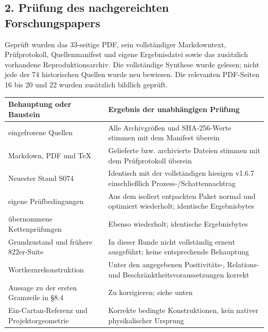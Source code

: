 \subsection{2. Prüfung des nachgereichten
Forschungspapers}\label{pruxfcfung-des-nachgereichten-forschungspapers}

Geprüft wurden das 33-seitige PDF, sein vollständiger Markdowntext,
Prüfprotokoll, Quellenmanifest und eigene Ergebnisdatei sowie das
zusätzlich vorhandene Reproduktionsarchiv. Die vollständige Synthese
wurde gelesen; nicht jede der 74 historischen Quellen wurde neu
bewiesen. Die relevanten PDF-Seiten 16 bis 20 und 22 wurden zusätzlich
bildlich geprüft.

{\def\LTcaptype{none} %
\begin{longtable}[]{@{}
  >{\raggedright\arraybackslash}p{}
  >{\raggedright\arraybackslash}p{}@{}}
\toprule\noalign{}
\begin{minipage}[b]{\linewidth}\raggedright
Behauptung oder Baustein
\end{minipage} & \begin{minipage}[b]{\linewidth}\raggedright
Ergebnis der unabhängigen Prüfung
\end{minipage} \\
\midrule\noalign{}
\endhead
\bottomrule\noalign{}
\endlastfoot
74 eingefrorene Quellen & Alle Archivgrößen und SHA-256-Werte stimmen
mit dem Manifest überein \\
Markdown, PDF und TeX & Gelieferte bzw. archivierte Dateien stimmen mit
dem Prüfprotokoll überein \\
Neuester Stand S074 & Identisch mit der vollständigen hiesigen v1.6.7
einschließlich Prozess-/Schattennachtrag \\
57 eigene Prüfbedingungen & Aus dem isoliert entpackten Paket normal und
optimiert wiederholt; identische Ergebnisbytes \\
20 übernommene Kettenprüfungen & Ebenso wiederholt; identische
Ergebnisbytes \\
Grundzustand und frühere 822er-Suite & In dieser Runde nicht vollständig
erneut ausgeführt; keine entsprechende Behauptung \\
Wortkernrekonstruktion & Unter den angegebenen Positivitäts-, Relations-
und Beschränktheitsvoraussetzungen korrekt \\
Aussage zu der ersten Gramzeile in §8.4 & Zu korrigieren; siehe unten \\
Ein-Cartan-Referenz und Projektorgeometrie & Korrekte bedingte
Konstruktionen, kein nativer physikalischer Ursprung \\
\end{longtable}
}

